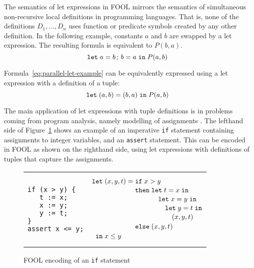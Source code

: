 \documentclass{easychair}
\begin{document}
The semantics of let expressions in FOOL mirrors the semantics of
simultaneous non-recursive local definitions in programming languages. 
That is, none of the definitions $D_1,\ldots,\allowbreak D_n$ uses function or
predicate symbols created by any other definition. 
In the following example, constants $a$ and $b$ are swapped by a let 
expression. 
The resulting formula is equivalent to $P(b, a)$.
\begin{equation}\label{eq:parallel-let-example}
\mathtt{let}\;{a}={b}\,;\,{b}={a}\;\mathtt{in}\;P(a, b)
\end{equation}

Formula~\ref{eq:parallel-let-example} can be equivalently expressed using 
a let expression with a definition of a tuple:
\begin{equation}\label{eq:parallel-let-tuple-example}
\mathtt{let}\;{(a,b)}={(b,a)}\;\mathtt{in}\;P(a, b)
\end{equation}

The main application of let expressions with tuple definitions is in 
problems coming from program analysis, namely modelling of assignments
\cite{KKV18}.
The lefthand side of Figure~\ref{fig:simple-if} shows an example of an 
imperative \texttt{if} statement containing assignments to integer variables, 
and an \texttt{assert} statement. 
This can be encoded in FOOL as shown on the righthand side, using 
let expressions with definitions of tuples that capture the assignments.

\begin{figure}[htbp]
\begin{center}
\begin{tabular}[t]{ll}
\begin{minipage}{0.3\textwidth}
\begin{verbatim}
if (x > y) {
   t := x;
   x := y;
   y := t;
}
assert x <= y;
\end{verbatim}
\end{minipage}
&
\begin{minipage}{0.3\textwidth}
\[
  \letnl{(x,y,t)}{\itenll{x > y}
                 {\letinnl{t}{x}
                          {\letinnl{x}{y}
                                   {\letinnl{y}{t}
                                            {(x,y,t)}}}}
                 {(x,y,t)}}
        {x \le y}
\]
\end{minipage}
\\
\end{tabular}
\end{center}
\caption{FOOL encoding of an {\tt if} statement}
\label{fig:simple-if}
\end{figure}
\end{document}
